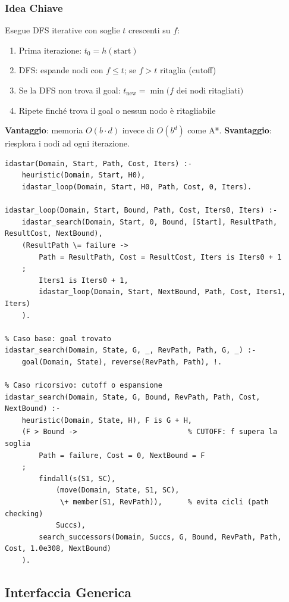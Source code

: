 \documentclass[12pt,a4paper]{article}
\begin{document}
\subsubsection{Idea Chiave}
Esegue DFS iterative con soglie $t$ crescenti su $f$:
\begin{enumerate}[noitemsep]
  \item Prima iterazione: $t_0 = h(\text{start})$
  \item DFS: espande nodi con $f \le t$; se $f > t$ ritaglia (cutoff)
  \item Se la DFS non trova il goal: $t_{\text{new}} = \min(f$ dei nodi ritagliati$)$
  \item Ripete finché trova il goal o nessun nodo è ritagliabile
\end{enumerate}

\textbf{Vantaggio}: memoria $O(b \cdot d)$ invece di $O(b^d)$ come A*.
\textbf{Svantaggio}: riesplora i nodi ad ogni iterazione.

\begin{lstlisting}
idastar(Domain, Start, Path, Cost, Iters) :-
    heuristic(Domain, Start, H0),
    idastar_loop(Domain, Start, H0, Path, Cost, 0, Iters).

idastar_loop(Domain, Start, Bound, Path, Cost, Iters0, Iters) :-
    idastar_search(Domain, Start, 0, Bound, [Start], ResultPath, ResultCost, NextBound),
    (ResultPath \= failure ->
        Path = ResultPath, Cost = ResultCost, Iters is Iters0 + 1
    ;
        Iters1 is Iters0 + 1,
        idastar_loop(Domain, Start, NextBound, Path, Cost, Iters1, Iters)
    ).

% Caso base: goal trovato
idastar_search(Domain, State, G, _, RevPath, Path, G, _) :-
    goal(Domain, State), reverse(RevPath, Path), !.

% Caso ricorsivo: cutoff o espansione
idastar_search(Domain, State, G, Bound, RevPath, Path, Cost, NextBound) :-
    heuristic(Domain, State, H), F is G + H,
    (F > Bound ->                          % CUTOFF: f supera la soglia
        Path = failure, Cost = 0, NextBound = F
    ;
        findall(s(S1, SC),
            (move(Domain, State, S1, SC),
             \+ member(S1, RevPath)),      % evita cicli (path checking)
            Succs),
        search_successors(Domain, Succs, G, Bound, RevPath, Path, Cost, 1.0e308, NextBound)
    ).
\end{lstlisting}

\subsection{Interfaccia Generica}
\end{document}
